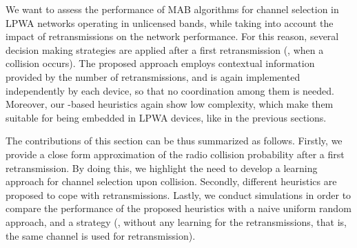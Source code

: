 



We want to assess the performance of MAB algorithms for channel selection in LPWA networks operating in unlicensed bands, while taking into account the impact of retransmissions on the network performance.
For this reason, several decision making strategies are applied after a first retransmission (\ie, when a collision occurs).
The proposed approach employs contextual information provided by the number of retransmissions, and is again implemented independently by each device, so that no coordination among them is needed.
Moreover, our \UCB{}-based heuristics again show low complexity, which make them suitable for being embedded in LPWA devices, like in the previous sections.

The contributions of this section can be thus summarized as follows.
	Firstly, we provide a close form approximation of the radio collision probability after a first retransmission.
	By doing this, we highlight the need to develop a learning approach for channel selection upon collision.
%
	Secondly, different heuristics are proposed to cope with retransmissions.
%
	Lastly, we conduct simulations in order to compare the performance of the proposed heuristics with a naive uniform random approach, and a \UCB{} strategy (\ie, without any learning for the retransmissions, that is, the same channel is used for retransmission).




